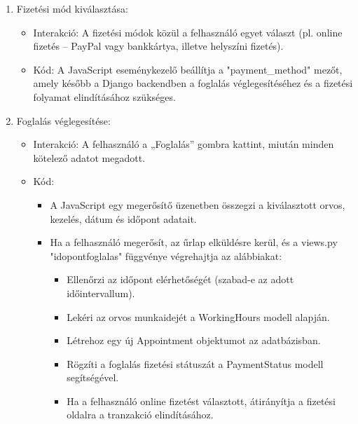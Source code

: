 \begin{enumerate}
	 	\item Fizetési mód kiválasztása:
	 \begin{itemize}
	 	\item Interakció: A fizetési módok közül a felhasználó egyet választ (pl. online fizetés – PayPal vagy bankkártya, illetve helyszíni fizetés).
	 	\item Kód: A JavaScript eseménykezelő beállítja a "payment\_method" mezőt, amely később a Django backendben a foglalás véglegesítéséhez és a fizetési folyamat elindításához szükséges.
	 \end{itemize}
	 \item Foglalás véglegesítése:
	 \begin{itemize}
	 	\item Interakció: A felhasználó a „Foglalás” gombra kattint, miután minden kötelező adatot megadott.
	 	\item Kód: 
	 	\begin{itemize}
	 		\item A JavaScript egy megerősítő üzenetben összegzi a kiválasztott orvos, kezelés, dátum és időpont adatait.
	 		\item Ha a felhasználó megerősít, az űrlap elküldésre kerül, és a views.py "idopontfoglalas" függvénye végrehajtja az alábbiakat:
	 		\begin{itemize}
	 			\item Ellenőrzi az időpont elérhetőségét (szabad-e az adott időintervallum).
	 			\item Lekéri az orvos munkaidejét a WorkingHours modell alapján.
	 			\item Létrehoz egy új Appointment objektumot az adatbázisban.
	 			\item Rögzíti a foglalás fizetési státuszát a PaymentStatus modell segítségével.
	 			\item Ha a felhasználó online fizetést választott, átirányítja a fizetési oldalra a tranzakció elindításához.
	 		\end{itemize}
	 	\end{itemize}
	 \end{itemize}
\end{enumerate}


